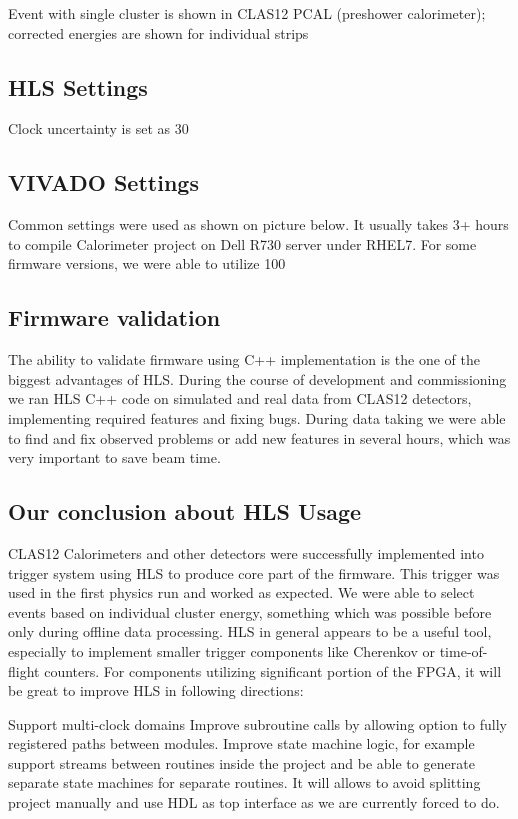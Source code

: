 Event with single cluster is shown in
CLAS12 PCAL (preshower calorimeter); corrected energies are shown for individual strips

\subsection{HLS Settings}

Clock uncertainty is set as 30%

\subsection{VIVADO Settings}

Common settings were used as shown on picture below. It usually takes 3+ hours to compile Calorimeter project on Dell R730 server under RHEL7. For some firmware versions, we were able to utilize 100%

\subsection{Firmware validation}

The ability to validate firmware using C++ implementation is the one of the biggest advantages of HLS. During the course of development and commissioning we ran HLS C++ code on simulated and real data from CLAS12 detectors, implementing required features and fixing bugs. During data taking we were able to find and fix observed problems or add new features in several hours, which was very important to save beam time.

\subsection{Our conclusion about HLS Usage}

CLAS12 Calorimeters and other detectors were successfully implemented into trigger system using HLS to produce core part of the firmware. This trigger was used in the first physics run and worked as expected. We were able to select events based on individual cluster energy, something which was possible before only during offline data processing.
HLS in general appears to be a useful tool, especially to implement smaller trigger components like Cherenkov or time-of-flight counters. For components utilizing significant portion of the FPGA, it will be great to improve HLS in following directions:

Support multi-clock domains
Improve subroutine calls by allowing option to fully registered paths between modules. 
Improve state machine logic, for example support streams between routines inside the project and be able to generate separate state machines for separate routines. It will allows to avoid splitting project manually and use HDL as top interface as we are currently forced to do.

